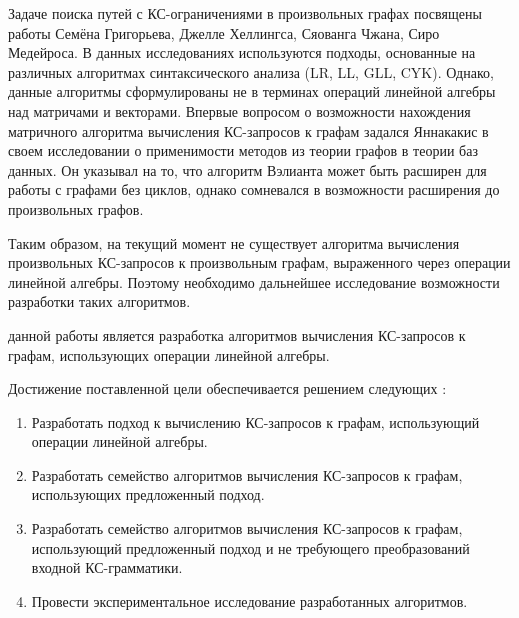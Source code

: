 Задаче поиска путей с КС-ограничениями в произвольных графах посвящены работы Семёна Григорьева, Джелле Хеллингса, Сяованга Чжана, Сиро Медейроса. В данных исследованиях используются подходы, основанные на различных алгоритмах синтаксического анализа (LR, LL, GLL, CYK). Однако, данные алгоритмы сформулированы не в терминах операций линейной алгебры над матричами и векторами. Впервые вопросом о возможности нахождения матричного алгоритма вычисления КС-запросов к графам задался Яннакакис в своем исследовании о применимости методов из теории графов в теории баз данных. Он указывал на то, что алгоритм Вэлианта может быть расширен для работы с графами без циклов, однако сомневался в возможности расширения до произвольных графов.

Таким образом, на текущий момент не существует алгоритма вычисления произвольных КС-запросов к произвольным графам, выраженного через операции линейной алгебры. Поэтому необходимо дальнейшее исследование возможности разработки таких алгоритмов.

{\aim} данной работы является разработка алгоритмов вычисления КС-запросов к графам, использующих операции линейной алгебры.

Достижение поставленной цели обеспечивается решением следующих {\tasks}:
\begin{enumerate}[beginpenalty=10000] %
  \item Разработать подход к вычислению КС-запросов к графам, использующий операции линейной алгебры.
  \item Разработать семейство алгоритмов вычисления КС-запросов к графам, использующих предложенный подход.
  \item Разработать семейство алгоритмов вычисления КС-запросов к графам, использующий предложенный подход и не требующего преобразований входной КС-грамматики.
  \item Провести экспериментальное исследование разработанных алгоритмов.
\end{enumerate}


